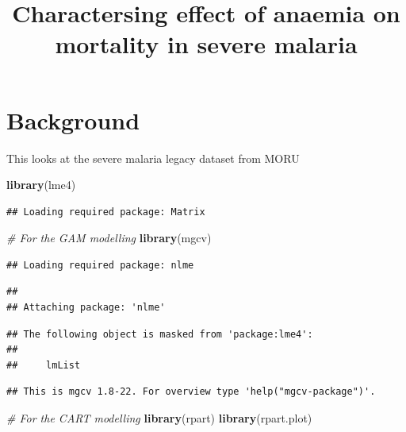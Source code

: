 \documentclass[]{article}
\title{Charactersing effect of anaemia on mortality in severe malaria}
\author{}
\date{}
\newenvironment{Shaded}{\begin{snugshade}}{\end{snugshade}}
\newcommand{\KeywordTok}[1]{\textcolor[rgb]{0.13,0.29,0.53}{\textbf{#1}}}
\newcommand{\CommentTok}[1]{\textcolor[rgb]{0.56,0.35,0.01}{\textit{#1}}}
\newcommand{\NormalTok}[1]{#1}
\begin{document}
\maketitle

{
\setcounter{tocdepth}{2}
\tableofcontents
}
\section{Background}\label{background}

This looks at the severe malaria legacy dataset from MORU

\begin{Shaded}
\begin{Highlighting}[]
\KeywordTok{library}\NormalTok{(lme4)}
\end{Highlighting}
\end{Shaded}

\begin{verbatim}
## Loading required package: Matrix
\end{verbatim}

\begin{Shaded}
\begin{Highlighting}[]
\CommentTok{# For the GAM modelling}
\KeywordTok{library}\NormalTok{(mgcv)}
\end{Highlighting}
\end{Shaded}

\begin{verbatim}
## Loading required package: nlme
\end{verbatim}

\begin{verbatim}
## 
## Attaching package: 'nlme'
\end{verbatim}

\begin{verbatim}
## The following object is masked from 'package:lme4':
## 
##     lmList
\end{verbatim}

\begin{verbatim}
## This is mgcv 1.8-22. For overview type 'help("mgcv-package")'.
\end{verbatim}

\begin{Shaded}
\begin{Highlighting}[]
\CommentTok{# For the CART modelling}
\KeywordTok{library}\NormalTok{(rpart)}
\KeywordTok{library}\NormalTok{(rpart.plot)}
\end{Highlighting}
\end{Shaded}
\end{document}
